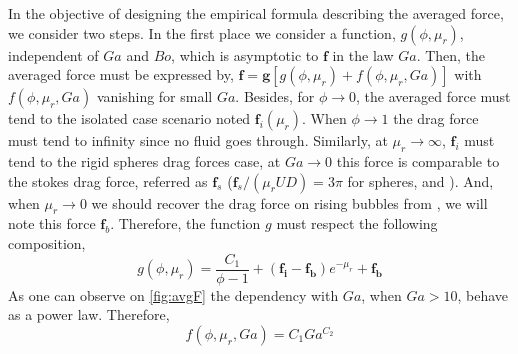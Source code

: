 In the objective of designing the empirical formula describing the averaged force, we consider two steps. 
In the first place we consider a function, $g(\phi,\mu_r)$, independent of $Ga$ and $Bo$, which is asymptotic to $\bm{f}$ in the law $Ga$.
Then, the averaged force must be expressed by, $\bm{f} = \bm{g} \left[g(\phi,\mu_r) + f(\phi,\mu_r,Ga)\right]$ with $f(\phi,\mu_r,Ga)$ vanishing for small $Ga$. 
Besides, for $\phi \rightarrow 0$, the averaged force must tend to the isolated case scenario noted $\bm{f}_i(\mu_r)$. 
When $\phi \rightarrow 1$ the drag force must tend to infinity since no fluid goes through. 
Similarly, at $\mu_r \rightarrow \infty$, $\bm{f}_i$ must tend to the rigid spheres drag forces case,
at $Ga \rightarrow 0$ this force is comparable to the stokes drag force, referred as $\bm{f}_s$ \citep{guazzelli2011} ($\bm{f}_s/(\mu_r U D) = 3\pi$ for spheres, and \cite{khayat1989inertia}). 
And, when $\mu_r \rightarrow 0$ we should recover the drag force on rising bubbles from \citet{tomiyama1998drag}, we will note this force $\bm{f}_b$. 
Therefore, the function $g$ must respect the following composition,
\begin{equation}
    g(\phi,\mu_r) = \frac{C_1}{\phi - 1} + (\bm{f_i} - \bm{f_b}) e^{-\mu_r} + \bm{f_b}
\end{equation}
As one can observe on \ref{fig:avgF} the dependency with $Ga$, when $Ga>10$, behave as a power law. 
Therefore, 
\begin{equation}
    f(\phi,\mu_r,Ga) = C_1 Ga^{C_2}
\end{equation}

